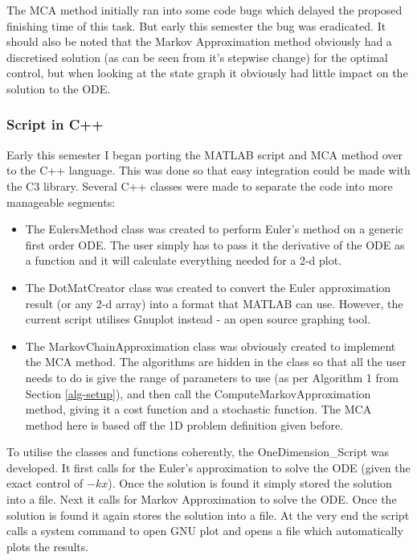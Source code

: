\documentclass[11pt,draftd]{article}
\begin{document}
\noindent The MCA method initially ran into some code bugs which delayed the proposed finishing time of this task. But early this semester the bug was eradicated. It should also be noted that the Markov Approximation method obviously had a discretised solution (as can be seen from it's stepwise change) for the optimal control, but when looking at the state graph it obviously had little impact on the solution to the ODE. \\

\subsubsection{Script in C++}
Early this semester I began porting the MATLAB script and MCA method over to the C++ language. This was done so that easy integration could be made with the C3 library. Several C++ classes were made to separate the code into more manageable segments: \\
\begin{itemize}
	\item The EulersMethod class was created to perform Euler's method on a generic first order ODE. The user simply has to pass it the derivative of the ODE as a function and it will calculate everything needed for a 2-d plot.
	\item The DotMatCreator class was created to convert the Euler approximation result (or any 2-d array) into a format that MATLAB can use. However, the current script utilises Gnuplot instead - an open source graphing tool.
	\item The MarkovChainApproximation class was obviously created to implement the MCA method. The algorithms are hidden in the class so that all the user needs to do is give the range of parameters to use (as per Algorithm 1 from Section \ref{alg-setup}), and then call the ComputeMarkovApproximation method, giving it a cost function and a stochastic function. The MCA method here is based off the 1D problem definition given before. \\
\end{itemize}

\noindent To utilise the classes and functions coherently, the OneDimension\_Script was developed. It first calls for the Euler's approximation to solve the ODE (given the exact control of $ -kx $). Once the solution is found it simply stored the solution into a file. Next it calls for Markov Approximation to solve the ODE. Once the solution is found it again stores the solution into a file. At the very end the script calls a system command to open GNU plot and opens a file which automatically plots the results. \\
\end{document}
